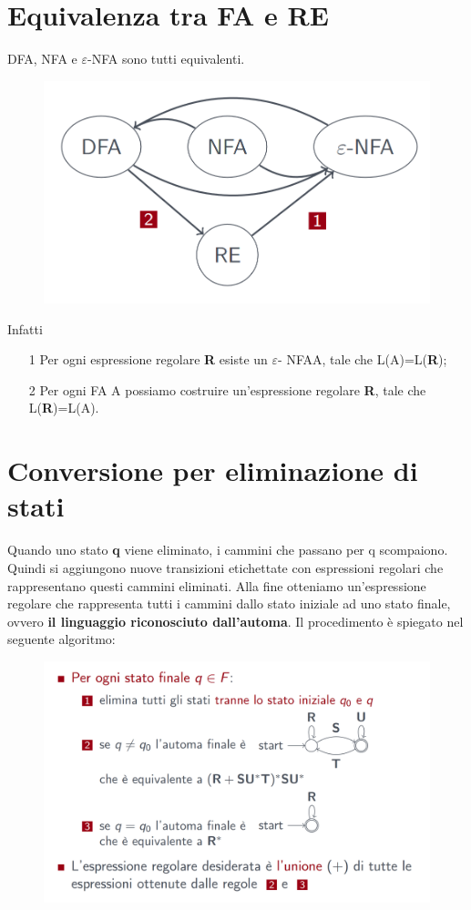 \section{Equivalenza tra FA e RE}
DFA, NFA e $\varepsilon$\textrm{-NFA} sono tutti equivalenti.

\begin{figure}[h]
\centering 
\includegraphics[scale=0.5]{Immagini/equivalenza3.png}
\end{figure}

Infatti 
\begin{itemize}
\item[1] Per ogni espressione regolare \textbf{R} esiste un $\varepsilon$\textrm{-
NFA}A, tale che L(A)=L(\textbf{R});
\item[2] Per ogni FA A possiamo costruire un'espressione regolare \textbf{R},
tale che L(\textbf{R})=L(A).
\end{itemize}

\section{Conversione per eliminazione di stati}
Quando uno stato \textbf{q} viene eliminato, i cammini che passano per q scompaiono.
Quindi si aggiungono nuove transizioni etichettate con espressioni regolari che 
rappresentano questi cammini eliminati. Alla fine otteniamo un'espressione regolare
che rappresenta tutti i cammini dallo stato iniziale ad uno stato finale, ovvero
\textbf{il linguaggio riconosciuto dall'automa}.
Il procedimento è spiegato nel seguente algoritmo:

\begin{figure}[h]
\centering 
\includegraphics[scale=0.5]{Immagini/strategia.png}
\end{figure}







